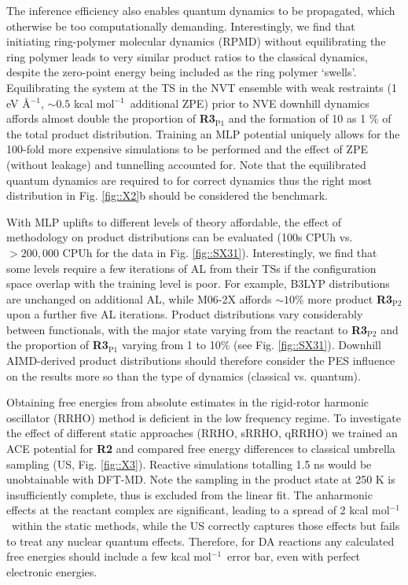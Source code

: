 \documentclass[twoside,twocolumn,9pt]{article}
\newcommand{\kcal}{kcal mol$^{-1}$}
\begin{document}
The inference efficiency also enables quantum dynamics to be propagated, which otherwise be too computationally demanding. Interestingly, we find that initiating ring-polymer molecular dynamics (RPMD)\cite{Habershon2013} without equilibrating the ring polymer leads to very similar product ratios to the classical dynamics, despite the zero-point energy being included as the ring polymer `swells’. Equilibrating the system at the TS in the NVT ensemble with weak restraints (1 eV \AA$^{-1}$, $\sim0.5$ \kcal~additional ZPE) prior to NVE downhill dynamics affords almost double the proportion of {\bfseries{R3$_\text{P1}$}} and the formation of 10 as 1 \% of the total product distribution. Training an MLP potential uniquely allows for the 100-fold more expensive simulations to be performed and the effect of ZPE (without leakage\cite{Lee2018}) and tunnelling accounted for. Note that the equilibrated quantum dynamics are required to for correct dynamics\cite{Liu2019} thus the right most distribution in Fig. \ref{fig::X2}b should be considered the benchmark.


With MLP uplifts to different levels of theory affordable, the effect of methodology on product distributions can be evaluated (100s CPUh vs. $>200,000$ CPUh for the data in Fig. \ref{fig::SX31}).  Interestingly, we find that some levels require a few iterations of AL from their TSs if the configuration space overlap with the training level is poor. For example, B3LYP distributions are unchanged on additional AL, while M06-2X affords $\sim10$\% more product {\bfseries{R3$_\text{P2}$}} upon a further five AL iterations. Product distributions vary considerably between functionals, with the major state varying from the reactant to {\bfseries{R3$_\text{P2}$}} and the proportion of {\bfseries{R3$_\text{P1}$}} varying from 1 to 10\% (see Fig. \ref{fig::SX31}). Downhill AIMD-derived product distributions should therefore consider the PES influence on the results more so than the type of dynamics (classical vs. quantum).


Obtaining free energies from absolute estimates in the rigid-rotor harmonic oscillator (RRHO) method is deficient in the low frequency regime.\cite{Liu2017} To investigate the effect of different static approaches (RRHO, sRRHO,\cite{Ribeiro2011} qRRHO\cite{Grimme2012}) we trained an ACE potential for {\bfseries{R2}} and compared free energy differences to classical umbrella sampling (US, Fig. \ref{fig::X3}). Reactive simulations totalling 1.5 ns would be unobtainable with DFT-MD. Note the sampling in the product state at 250 K is insufficiently complete, thus is excluded from the linear fit. The anharmonic effects at the reactant complex are significant, leading to a spread of 2 \kcal~within the static methods, while the US correctly captures those effects but fails to treat any nuclear quantum effects. Therefore, for DA reactions any calculated free energies should include a few \kcal~error bar, even with perfect electronic energies.
\end{document}
